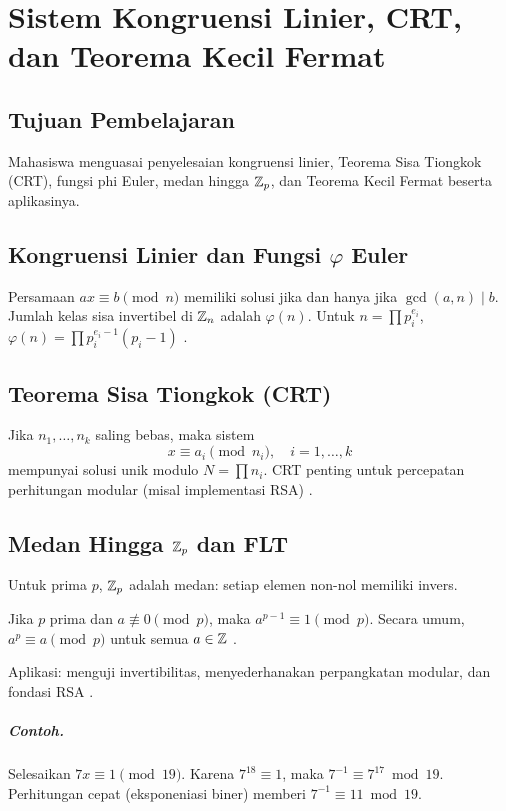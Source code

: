 \documentclass[../main.tex]{subfiles}
\begin{document}
\chapter{Sistem Kongruensi Linier, CRT, dan Teorema Kecil Fermat}

\section{Tujuan Pembelajaran}
Mahasiswa menguasai penyelesaian kongruensi linier, Teorema Sisa Tiongkok (CRT), fungsi phi Euler, medan hingga \(\mathbb{Z}_p\), dan Teorema Kecil Fermat beserta aplikasinya.

\section{Kongruensi Linier dan Fungsi \(\varphi\) Euler}
Persamaan \(ax\equiv b\pmod n\) memiliki solusi jika dan hanya jika \(\gcd(a,n)\mid b\). Jumlah kelas sisa invertibel di \(\mathbb{Z}_n\) adalah \(\varphi(n)\). Untuk \(n=\prod p_i^{e_i}\), \(\varphi(n)=\prod p_i^{e_i-1}(p_i-1)\) \citep{hoffstein}.

\section{Teorema Sisa Tiongkok (CRT)}
Jika \(n_1,\dots,n_k\) saling bebas, maka sistem
\[ x\equiv a_i \pmod{n_i},\quad i=1,\dots,k \]
mempunyai solusi unik modulo \(N=\prod n_i\). CRT penting untuk percepatan perhitungan modular (misal implementasi RSA) \citep{menezes}.

\section{Medan Hingga \(\mathbb{Z}_p\) dan FLT}
Untuk prima \(p\), \(\mathbb{Z}_p\) adalah medan: setiap elemen non-nol memiliki invers.
\begin{theorem}
Jika \(p\) prima dan \(a\not\equiv 0\pmod p\), maka \(a^{p-1}\equiv 1\pmod p\). Secara umum, \(a^p\equiv a\pmod p\) untuk semua \(a\in\mathbb{Z}\) \citep{rosen}.
\end{theorem}
Aplikasi: menguji invertibilitas, menyederhanakan perpangkatan modular, dan fondasi RSA \citep{rsa}.

\paragraph{Contoh.} Selesaikan \(7x\equiv 1\pmod{19}\). Karena \(7^{18}\equiv 1\), maka \(7^{-1}\equiv 7^{17} \bmod 19\). Perhitungan cepat (eksponeniasi biner) memberi \(7^{-1}\equiv 11\bmod 19\).
\end{document}
